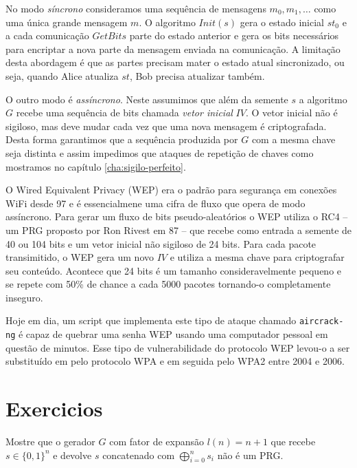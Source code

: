 No modo {\em síncrono} consideramos uma sequência de mensagens $m_0, m_1, \dots$ como uma única grande mensagem $m$.
O algoritmo $Init(s)$ gera o estado inicial $st_0$ e a cada comunicação $GetBits$ parte do estado anterior e gera os bits necessários para encriptar a nova parte da mensagem enviada na comunicação.
A limitação desta abordagem é que as partes precisam mater o estado atual sincronizado, ou seja, quando Alice atualiza $st$, Bob precisa atualizar também.

O outro modo é {\em assíncrono}.
Neste assumimos que além da semente $s$ a algoritmo $G$ recebe uma sequência de bits chamada {\em vetor inicial} $IV$.
O vetor inicial não é sigiloso, mas deve mudar cada vez que uma nova mensagem é criptografada.
Desta forma garantimos que a sequência produzida por $G$ com a mesma chave seja distinta e assim impedimos que ataques de repetição de chaves como mostramos no capítulo \ref{cha:sigilo-perfeito}.


\begin{example}
O Wired Equivalent Privacy (WEP) era o padrão para segurança em conexões WiFi desde 97 e é essencialmene uma cifra de fluxo que opera de modo assíncrono.
Para gerar um fluxo de bits pseudo-aleatórios o WEP utiliza o RC4 -- um PRG proposto por Ron Rivest em 87 -- que recebe como entrada a semente de 40 ou 104 bits e um vetor inicial não sigiloso de 24 bits.
Para cada pacote transimitido, o WEP gera um novo $IV$ e utiliza a mesma chave para criptografar seu conteúdo.
Acontece que 24 bits é um tamanho consideravelmente pequeno e se repete com 50\% de chance a cada 5000 pacotes tornando-o completamente inseguro.

Hoje em dia, um script que implementa este tipo de ataque chamado {\tt aircrack-ng} é capaz de quebrar uma senha WEP usando uma computador pessoal em questão de minutos.
Esse tipo de vulnerabilidade do protocolo WEP levou-o a ser substituído em pelo protocolo WPA e em seguida pelo WPA2 entre 2004 e 2006.
\end{example}


\section{Exercicios}
\label{sec:exercicios}

\begin{exercicio}
Mostre que o gerador $G$ com fator de expansão $l(n) = n + 1$ que recebe $s \in \{0,1\}^n$ e devolve $s$ concatenado com $\bigoplus_{i=0}^ns_i$ não é um PRG.  
\end{exercicio}

